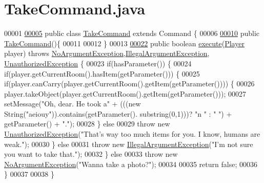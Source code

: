 \hypertarget{TakeCommand_8java_source}{\section{Take\-Command.\-java}
}

\begin{DoxyCode}
00001 
\hypertarget{TakeCommand_8java_source_l00005}{}\hyperlink{classTakeCommand}{00005} \textcolor{keyword}{public} \textcolor{keyword}{class }\hyperlink{classTakeCommand}{TakeCommand} \textcolor{keyword}{extends} Command \{
00006 
\hypertarget{TakeCommand_8java_source_l00010}{}\hyperlink{classTakeCommand_a99adf41b921a59fe81700461cbba59a8}{00010}     \textcolor{keyword}{public} \hyperlink{classTakeCommand_a99adf41b921a59fe81700461cbba59a8}{TakeCommand}()\{
00011 
00012     \}
00013 
\hypertarget{TakeCommand_8java_source_l00022}{}\hyperlink{classTakeCommand_af316002e14bb3253d24bcb03282213ee}{00022}     \textcolor{keyword}{public} \textcolor{keywordtype}{boolean} \hyperlink{classTakeCommand_af316002e14bb3253d24bcb03282213ee}{execute}(\hyperlink{classPlayer}{Player} player) \textcolor{keywordflow}{throws} 
      \hyperlink{classNoArgumentException}{NoArgumentException},\hyperlink{classIllegalArgumentException}{IllegalArgumentException},
      \hyperlink{classUnauthorizedException}{UnauthorizedException} \{
00023         \textcolor{keywordflow}{if}(hasParameter()) \{
00024             \textcolor{keywordflow}{if}(player.getCurrentRoom().hasItem(getParameter())) \{
00025                 \textcolor{keywordflow}{if}(player.canCarry(player.getCurrentRoom().getItem(getParameter()))) \{
00026                     player.takeObject(player.getCurrentRoom().getItem(getParameter()));
00027                     setMessage(\textcolor{stringliteral}{"Oh, dear. He took a"} + (((\textcolor{keyword}{new} String(\textcolor{stringliteral}{"aeiouy"})).contains(getParameter().
      substring(0,1)))? \textcolor{stringliteral}{"n "} : \textcolor{stringliteral}{" "}) + getParameter() + \textcolor{stringliteral}{"."});
00028                 \} \textcolor{keywordflow}{else}
00029                     \textcolor{keywordflow}{throw} \textcolor{keyword}{new} \hyperlink{classUnauthorizedException}{UnauthorizedException}(\textcolor{stringliteral}{"That's way too much items for
       you. I know, humans are weak."});
00030             \} \textcolor{keywordflow}{else}
00031                 \textcolor{keywordflow}{throw} \textcolor{keyword}{new} \hyperlink{classIllegalArgumentException}{IllegalArgumentException}(\textcolor{stringliteral}{"I'm not sure you want to take
       that."});
00032         \} \textcolor{keywordflow}{else}
00033             \textcolor{keywordflow}{throw} \textcolor{keyword}{new} \hyperlink{classNoArgumentException}{NoArgumentException}(\textcolor{stringliteral}{"Wanna take a photo?"});
00034 
00035         \textcolor{keywordflow}{return} \textcolor{keyword}{false};
00036     \}
00037 
00038 \}
\end{DoxyCode}
